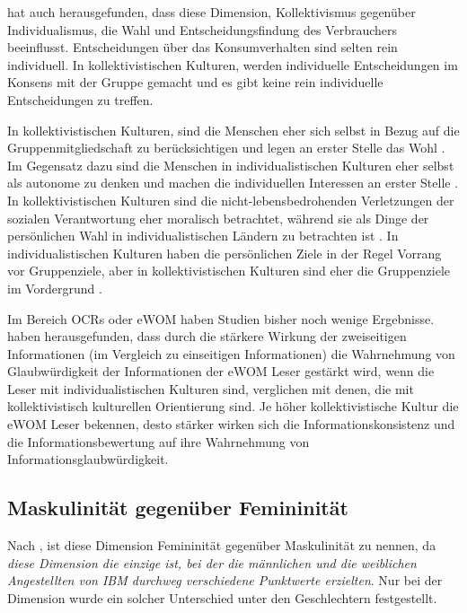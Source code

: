 \citeauthor{hofstede1998masculinity} hat auch herausgefunden, dass diese Dimension, Kollektivismus gegenüber Individualismus, die Wahl und Entscheidungsfindung des Verbrauchers beeinflusst. Entscheidungen über das Konsumverhalten sind selten rein individuell. In kollektivistischen Kulturen, werden individuelle Entscheidungen im Konsens mit der Gruppe gemacht und es gibt keine rein individuelle Entscheidungen zu treffen.\citep[p. ~65]{hofstede1998masculinity}

In kollektivistischen Kulturen, sind die Menschen eher sich selbst in Bezug auf die Gruppenmitgliedschaft zu berücksichtigen und legen an erster Stelle das Wohl \citep{triandis1994theoretical}. Im Gegensatz dazu sind die Menschen in individualistischen Kulturen eher selbst als autonome zu denken und machen die individuellen Interessen an erster Stelle \citep{shweder1990defense}. In kollektivistischen Kulturen sind die nicht-lebensbedrohenden Verletzungen der sozialen Verantwortung eher moralisch betrachtet, während sie als Dinge der persönlichen Wahl in individualistischen Ländern zu betrachten ist \citep{miller1990perceptions}. In individualistischen Kulturen haben die persönlichen Ziele in der Regel Vorrang vor Gruppenziele, aber in kollektivistischen Kulturen sind eher die Gruppenziele im Vordergrund \citep{triandis1994theoretical}.

Im Bereich \ac{OCRs} oder \ac{eWOM} haben Studien bisher noch wenige Ergebnisse. \citet{Luo2014} haben herausgefunden, dass durch die stärkere Wirkung der zweiseitigen Informationen (im Vergleich zu einseitigen Informationen) die Wahrnehmung von Glaubwürdigkeit der Informationen der \ac{eWOM} Leser gestärkt wird, wenn die Leser mit individualistischen Kulturen sind, verglichen mit denen, die mit kollektivistisch kulturellen Orientierung sind. Je höher kollektivistische Kultur die \ac{eWOM} Leser bekennen, desto stärker wirken sich die Informationskonsistenz und die Informationsbewertung auf ihre Wahrnehmung von Informationsglaubwürdigkeit. 
\subsection{Maskulinität gegenüber Femininität}
Nach \citet{hofstede2013interkulturelle}, ist diese Dimension Femininität gegenüber Maskulinität zu nennen, da \emph{diese Dimension die einzige ist, bei der die männlichen und die weiblichen Angestellten von IBM durchweg verschiedene Punktwerte erzielten}. Nur bei der Dimension wurde ein solcher Unterschied unter den Geschlechtern festgestellt. \citep[p. ~101]{hofstede2013interkulturelle}

